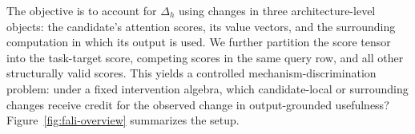 The objective is to account for $\Delta_h$ using changes in three architecture-level objects: the candidate's attention scores, its value vectors, and the surrounding computation in which its output is used. We further partition the score tensor into the task-target score, competing scores in the same query row, and all other structurally valid scores. This yields a controlled mechanism-discrimination problem: under a fixed intervention algebra, which candidate-local or surrounding changes receive credit for the observed change in output-grounded usefulness? Figure~\ref{fig:fali-overview} summarizes the setup.


